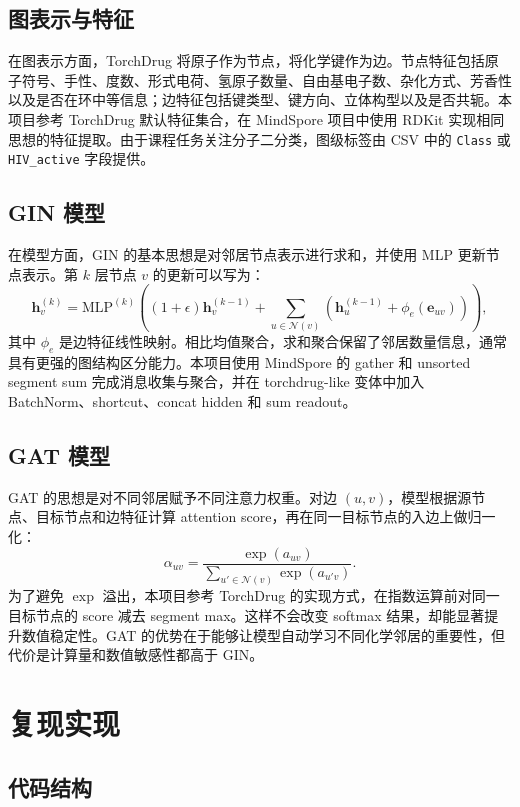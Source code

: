 \documentclass[12pt,hyperref,a4paper,UTF8]{ctexart}
\begin{document}
\subsection{图表示与特征}

在图表示方面，TorchDrug 将原子作为节点，将化学键作为边。节点特征包括原子符号、手性、度数、形式电荷、氢原子数量、自由基电子数、杂化方式、芳香性以及是否在环中等信息；边特征包括键类型、键方向、立体构型以及是否共轭。本项目参考 TorchDrug 默认特征集合，在 MindSpore 项目中使用 RDKit 实现相同思想的特征提取。由于课程任务关注分子二分类，图级标签由 CSV 中的 \texttt{Class} 或 \texttt{HIV\_active} 字段提供。

\subsection{GIN 模型}

在模型方面，GIN 的基本思想是对邻居节点表示进行求和，并使用 MLP 更新节点表示。第 $k$ 层节点 $v$ 的更新可以写为：
\[
\mathbf{h}_{v}^{(k)}
=\mathrm{MLP}^{(k)}
\left((1+\epsilon)\mathbf{h}_{v}^{(k-1)}
+\sum_{u\in\mathcal{N}(v)}
\left(\mathbf{h}_{u}^{(k-1)}+\phi_e(\mathbf{e}_{uv})\right)\right),
\]
其中 $\phi_e$ 是边特征线性映射。相比均值聚合，求和聚合保留了邻居数量信息，通常具有更强的图结构区分能力。本项目使用 MindSpore 的 gather 和 unsorted segment sum 完成消息收集与聚合，并在 torchdrug-like 变体中加入 BatchNorm、shortcut、concat hidden 和 sum readout。

\subsection{GAT 模型}

GAT 的思想是对不同邻居赋予不同注意力权重。对边 $(u,v)$，模型根据源节点、目标节点和边特征计算 attention score，再在同一目标节点的入边上做归一化：
\[
\alpha_{uv}=\frac{\exp(a_{uv})}{\sum_{u'\in\mathcal{N}(v)}\exp(a_{u'v})}.
\]
为了避免 $\exp$ 溢出，本项目参考 TorchDrug 的实现方式，在指数运算前对同一目标节点的 score 减去 segment max。这样不会改变 softmax 结果，却能显著提升数值稳定性。GAT 的优势在于能够让模型自动学习不同化学邻居的重要性，但代价是计算量和数值敏感性都高于 GIN。

\section{复现实现}

\subsection{代码结构}
\end{document}
